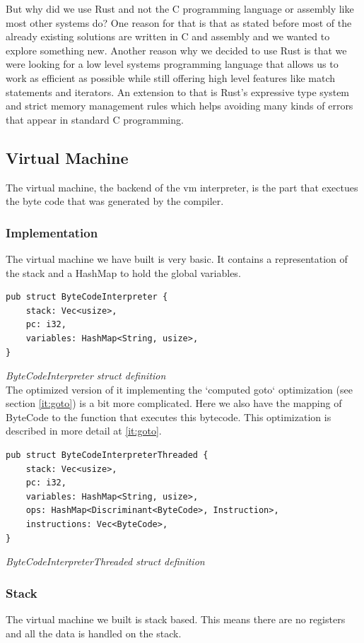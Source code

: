 \documentclass{article}
\begin{document}
But why did we use Rust and not the C programming language or assembly like
most other systems do?
One reason for that is that as stated before most of the already existing
solutions are written in C and assembly and we wanted to explore something new.
Another reason why we decided to use Rust is that we were looking for a low level
systems programming language that allows us to work as efficient as possible
while still offering high level features like match statements and iterators.
An extension to that is Rust's expressive type system and strict memory
management rules which helps avoiding many kinds of errors that appear in 
standard C programming.

\subsection{Virtual Machine}
The virtual machine, the backend of the vm interpreter, is the part that
exectues the byte code that was generated by the compiler.

\subsubsection{Implementation}
The virtual machine we have built is very basic. It contains a representation
of the stack and a HashMap to hold the global variables.

\begin{verbatim}
pub struct ByteCodeInterpreter {
    stack: Vec<usize>,
    pc: i32,
    variables: HashMap<String, usize>,
}
\end{verbatim}
\textit{ByteCodeInterpreter struct definition} \\

The optimized version of it implementing the `computed goto` optimization (see
section \ref{it:goto}) is a bit more complicated. Here we also have the mapping
of ByteCode to the function that executes this bytecode. This optimization is 
described in more detail at \ref{it:goto}.

\begin{verbatim}
pub struct ByteCodeInterpreterThreaded {
    stack: Vec<usize>,
    pc: i32,
    variables: HashMap<String, usize>,
    ops: HashMap<Discriminant<ByteCode>, Instruction>,
    instructions: Vec<ByteCode>,
}
\end{verbatim}
\textit{ByteCodeInterpreterThreaded struct definition} \\

\subsubsection{Stack}
The virtual machine we built is stack based. This means there are no registers
and all the data is handled on the stack.
\end{document}
